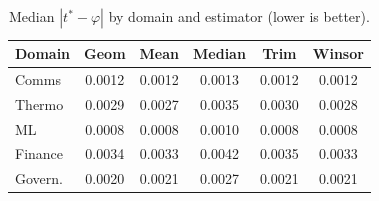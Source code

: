 \begin{table}[!t]
\centering
\caption{Median $|t^* - \varphi|$ by domain and estimator (lower is better).}
\label{tab:robust_grid}
\small
\begin{tabular}{@{}lccccc@{}}
\toprule
Domain & Geom & Mean & Median & Trim & Winsor \\
\midrule
Comms & 0.0012 & 0.0012 & 0.0013 & 0.0012 & 0.0012 \\
Thermo & 0.0029 & 0.0027 & 0.0035 & 0.0030 & 0.0028 \\
ML & 0.0008 & 0.0008 & 0.0010 & 0.0008 & 0.0008 \\
Finance & 0.0034 & 0.0033 & 0.0042 & 0.0035 & 0.0033 \\
Govern. & 0.0020 & 0.0021 & 0.0027 & 0.0021 & 0.0021 \\
\bottomrule
\end{tabular}
\end{table}
